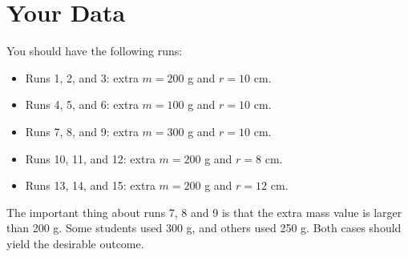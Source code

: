 \section{Your Data}
%
You should have the following runs:
\begin{itemize}
    \item Runs 1, 2, and 3: extra $m = 200$ g and $r = 10$ cm.
    \item Runs 4, 5, and 6: extra $m = 100$ g and $r = 10$ cm.
    \item Runs 7, 8, and 9: extra $m = 300$ g and $r = 10$ cm.
    \item Runs 10, 11, and 12: extra $m = 200$ g and $r = 8$ cm.
    \item Runs 13, 14, and 15: extra $m = 200$ g and $r = 12$ cm.
\end{itemize}
The important thing about runs 7, 8 and 9 is that the extra mass value is larger than 200 g. Some students used 300 g, and others used 250 g. Both cases should yield the desirable outcome.
%
%
\newpage
